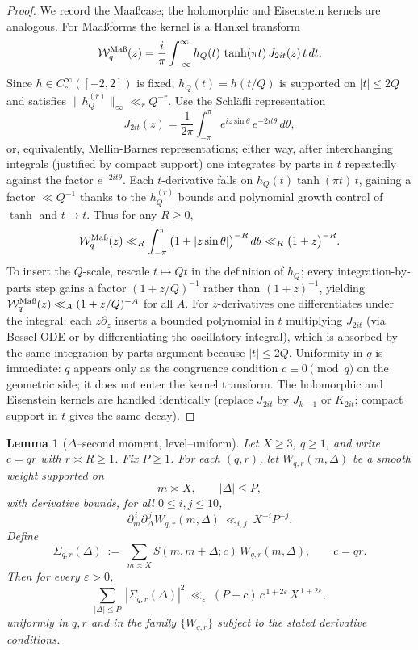 \documentclass[11pt]{article}
\newtheorem{lemma}{Lemma}[part]
\theoremstyle{definition}
\theoremstyle{remark}
\numberwithin{equation}{part}
\begin{document}
\begin{proof}
	We record the Maa\ss case; the holomorphic and Eisenstein kernels are analogous. For Maa\ss forms the kernel is a Hankel transform
	\[
		\mathcal W_{q}^{\mathrm{Ma\text\ss}}(z)
		= \frac{i}{\pi}\int_{-\infty}^{\infty} h_Q(t)\,\tanh(\pi t)\,J_{2it}(z)\,t\,dt.
	\]
	Since $h\in C_c^\infty([-2,2])$ is fixed, $h_Q(t)=h(t/Q)$ is supported on $|t|\le 2Q$ and satisfies $\|h_Q^{(r)}\|_\infty\ll_r Q^{-r}$. Use the Schl\"afli representation
	\[
		J_{2it}(z)=\frac{1}{2\pi}\int_{-\pi}^{\pi} e^{iz\sin\theta}\,e^{-2it\theta}\,d\theta,
	\]
	or, equivalently, Mellin-Barnes representations; either way, after interchanging integrals (justified by compact support) one integrates by parts in $t$ repeatedly against the factor $e^{-2it\theta}$. Each $t$-derivative falls on $h_Q(t)\tanh(\pi t)\,t$, gaining a factor $\ll Q^{-1}$ thanks to the $h_Q^{(r)}$ bounds and polynomial growth control of $\tanh$ and $t\mapsto t$. Thus for any $R\ge0$,
	\[
		\mathcal W_{q}^{\mathrm{Ma\text\ss}}(z) \ll_R \int_{-\pi}^{\pi} \big(1+|z\sin\theta|\big)^{-R}\,d\theta
		\ll_R \big(1+z\big)^{-R}.
	\]
	To insert the $Q$-scale, rescale $t\mapsto Qt$ in the definition of $h_Q$; every integration-by-parts step gains a factor $(1+z/Q)^{-1}$ rather than $(1+z)^{-1}$, yielding
	$\mathcal W_{q}^{\mathrm{Ma\text\ss}}(z)\ll_A (1+z/Q)^{-A}$ for all $A$. For $z$-derivatives one differentiates under the integral; each $z\partial_z$ inserts a bounded polynomial in $t$ multiplying $J_{2it}$ (via Bessel ODE or by differentiating the oscillatory integral), which is absorbed by the same integration-by-parts argument because $|t|\le 2Q$. Uniformity in $q$ is immediate: $q$ appears only as the congruence condition $c\equiv 0\pmod q$ on the geometric side; it does not enter the kernel transform. The holomorphic and Eisenstein kernels are handled identically (replace $J_{2it}$ by $J_{k-1}$ or $K_{2it}$; compact support in $t$ gives the same decay).
\end{proof}



\begin{lemma}[{\boldmath $\Delta$--second moment, level--uniform}]
	\label{lem:delta-second-moment-fullyrigid}
	Let $X\ge 3$, $q\ge 1$, and write $c=qr$ with $r\asymp R\ge 1$.
	Fix $P\ge 1$. For each $(q,r)$, let $W_{q,r}(m,\Delta)$ be a smooth weight supported on
	\[
		m\asymp X,\qquad |\Delta|\le P,
	\]
	with derivative bounds, for all $0\le i,j\le 10$,
	\[
		\partial_m^{\,i}\partial_\Delta^{\,j}W_{q,r}(m,\Delta)\ \ll_{i,j}\ X^{-i}P^{-j}.
	\]
	Define
	\[
		\Sigma_{q,r}(\Delta)\ :=\ \sum_{m\asymp X} S(m,m+\Delta;c)\,W_{q,r}(m,\Delta),
		\qquad c=qr.
	\]
	Then for every $\varepsilon>0$,
	\[
		\sum_{|\Delta|\le P}\ |\Sigma_{q,r}(\Delta)|^2
		\ \ll_{\varepsilon}\ (P+c)\,c^{\,1+2\varepsilon}\,X^{\,1+2\varepsilon},
	\]
	uniformly in $q,r$ and in the family $\{W_{q,r}\}$ subject to the stated derivative conditions.
\end{lemma}
\end{document}
